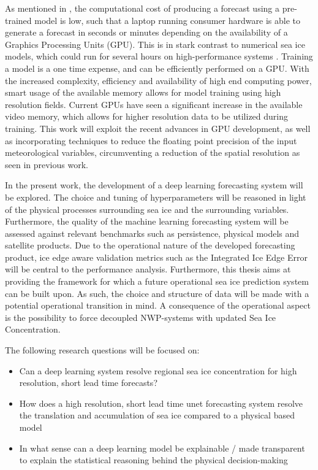 \documentclass[../main/thesis.tex]{subfiles}
\begin{document}
As mentioned in \cite{Andersson2021, Fritzner2020}, the computational cost of producing a forecast using a pre-trained model is low, such that a laptop running consumer hardware is able to generate a forecast in seconds or minutes depending on the availability of a Graphics Processing Units (GPU). This is in stark contrast to numerical sea ice models, which could run for several hours on high-performance systems \cite{Andersson2021}. Training a model is a one time expense, and can be efficiently performed on a GPU. With the increased complexity, efficiency and availability of high end computing power, smart usage of the available memory allows for model training using high resolution fields. Current GPUs have seen a significant increase in the available video memory, which allows for higher resolution data to be utilized during training. This work will exploit the recent advances in GPU development, as well as incorporating techniques to reduce the floating point precision of the input meteorological variables, circumventing a reduction of the spatial resolution as seen in previous work.

In the present work, the development of a deep learning forecasting system will be explored. The choice and tuning of hyperparameters will be reasoned in light of the physical processes surrounding sea ice and the surrounding variables. Furthermore, the quality of the machine learning forecasting system will be assessed against relevant benchmarks such as persistence, physical models and satellite products. Due to the operational nature of the developed forecasting product, ice edge aware validation metrics such as the Integrated Ice Edge Error \cite{Goessling2016} will be central to the performance analysis. Furthermore, this thesis aims at providing the framework for which a future operational sea ice prediction system can be built upon. As such, the choice and structure of data will be made with a potential operational transition in mind. A consequence of the operational aspect is the possibility to force decoupled NWP-systems with updated Sea Ice Concentration.

The following research questions will be focused on: 
\begin{itemize}
    \item Can a deep learning system resolve regional sea ice concentration for high resolution, short lead time forecasts? 
    \item How does a high resolution, short lead time unet forecasting system resolve the translation and accumulation of sea ice compared to a physical based model
    \item  In what sense can a deep learning model be explainable / made transparent to explain the statistical reasoning behind the physical decision-making
\end{itemize}
\end{document}
